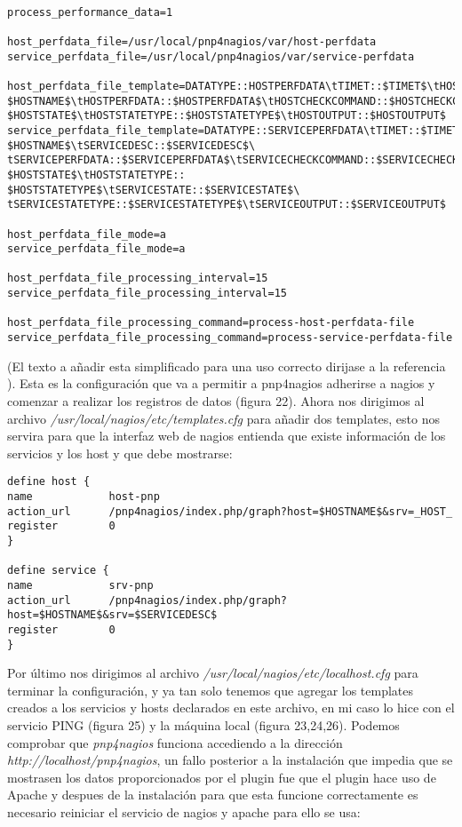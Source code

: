 \documentclass[a4paper, 10pt]{article} %
\begin{document}
\begin{verbatim}

process_performance_data=1

host_perfdata_file=/usr/local/pnp4nagios/var/host-perfdata
service_perfdata_file=/usr/local/pnp4nagios/var/service-perfdata

host_perfdata_file_template=DATATYPE::HOSTPERFDATA\tTIMET::$TIMET$\tHOSTNAME::
$HOSTNAME$\tHOSTPERFDATA::$HOSTPERFDATA$\tHOSTCHECKCOMMAND::$HOSTCHECKCOMMAND$\tHOSTSTATE::
$HOSTSTATE$\tHOSTSTATETYPE::$HOSTSTATETYPE$\tHOSTOUTPUT::$HOSTOUTPUT$
service_perfdata_file_template=DATATYPE::SERVICEPERFDATA\tTIMET::$TIMET$\tHOSTNAME::
$HOSTNAME$\tSERVICEDESC::$SERVICEDESC$\
tSERVICEPERFDATA::$SERVICEPERFDATA$\tSERVICECHECKCOMMAND::$SERVICECHECKCOMMAND$\tHOSTSTATE::
$HOSTSTATE$\tHOSTSTATETYPE::
$HOSTSTATETYPE$\tSERVICESTATE::$SERVICESTATE$\
tSERVICESTATETYPE::$SERVICESTATETYPE$\tSERVICEOUTPUT::$SERVICEOUTPUT$

host_perfdata_file_mode=a
service_perfdata_file_mode=a

host_perfdata_file_processing_interval=15
service_perfdata_file_processing_interval=15

host_perfdata_file_processing_command=process-host-perfdata-file
service_perfdata_file_processing_command=process-service-perfdata-file
\end{verbatim}
(El texto a añadir esta simplificado para una uso correcto dirijase a la referencia \cite{5}). Esta es la configuración que va a permitir a pnp4nagios adherirse a nagios y comenzar a realizar los registros de datos (figura 22). Ahora nos dirigimos al archivo \textit{/usr/local/nagios/etc/templates.cfg} para añadir dos templates, esto nos servira para que la interfaz web de nagios entienda que existe información de los servicios y los host y que debe mostrarse:
\begin{verbatim}
define host {
name            host-pnp
action_url      /pnp4nagios/index.php/graph?host=$HOSTNAME$&srv=_HOST_
register        0
}

define service {
name            srv-pnp
action_url      /pnp4nagios/index.php/graph?host=$HOSTNAME$&srv=$SERVICEDESC$
register        0
}
\end{verbatim}
Por último nos dirigimos al archivo \textit{/usr/local/nagios/etc/localhost.cfg} para terminar la configuración, y ya tan solo tenemos que agregar los templates creados a los servicios y hosts declarados en este archivo, en mi caso lo hice con el servicio PING (figura 25) y la máquina local (figura 23,24,26). Podemos comprobar que \textit{pnp4nagios} funciona accediendo a la dirección \textit{http://localhost/pnp4nagios}, un fallo posterior a la instalación que impedia que se mostrasen los datos proporcionados por el plugin fue que el plugin hace uso de Apache y despues de la instalación para que esta funcione correctamente es necesario reiniciar el servicio de nagios y apache para ello se usa:
\end{document}
